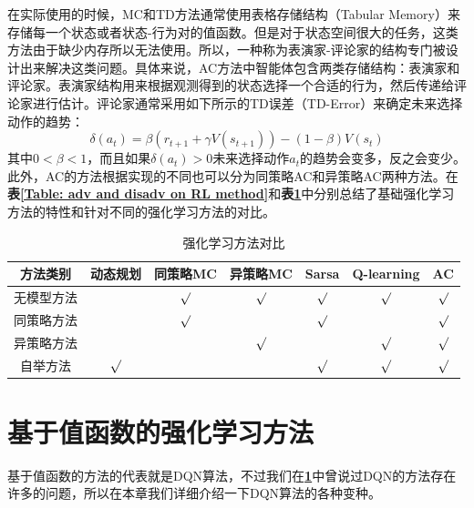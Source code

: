 在实际使用的时候，MC和TD方法通常使用表格存储结构（Tabular Memory）来存储每一个状态或者状态-行为对的值函数。但是对于状态空间很大的任务，这类方法由于缺少内存所以无法使用。所以，一种称为表演家-评论家的结构专门被设计出来解决这类问题。具体来说，AC方法中智能体包含两类存储结构：表演家和评论家。表演家结构用来根据观测得到的状态选择一个合适的行为，然后传递给评论家进行估计。评论家通常采用如下所示的TD误差（TD-Error）来确定未来选择动作的趋势：
\begin{equation}
    \delta\left(a_{t}\right)=\beta\left(r_{t+1}+\gamma V\left(s_{t+1}\right)\right)-(1-\beta) V\left(s_{t}\right)
\end{equation}
其中$0<\beta<1$，而且如果$\delta(a_t)>0$未来选择动作$a_t$的趋势会变多，反之会变少。此外，AC的方法根据实现的不同也可以分为同策略AC和异策略AC两种方法。在\textbf{表\ref{Table: adv and disadv on RL method}}和\textbf{表\ref{Table: compare on RL method}}中分别总结了基础强化学习方法的特性和针对不同的强化学习方法的对比。



\begin{table}[!tp]
    \caption{强化学习方法对比}
    
	\centering
	\begin{tabular}{c||c c c c c c }
    \hline
    方法类别&动态规划 & 同策略MC & 异策略MC&Sarsa &Q-learning &AC \\
    \hline
    无模型方法&        & $\surd$&$\surd$ & $\surd$&$\surd$  &$\surd$ \\
    同策略方法&        & $\surd$&        &$\surd$ &         & $\surd$\\
    异策略方法&        &        &$\surd$ &        &$\surd$  & $\surd$\\
    自举方法  & $\surd$&        &        &$\surd$ & $\surd$ & $\surd$\\
    
    \hline
    \end{tabular}
    \label{Table: compare on RL method}
    
\end{table}



\section{基于值函数的强化学习方法}
\label{sec: value_based method}

基于值函数的方法的代表就是DQN算法，不过我们在\textbf{\ref{sec: value_based method}}中曾说过DQN的方法存在许多的问题，所以在本章我们详细介绍一下DQN算法的各种变种。


